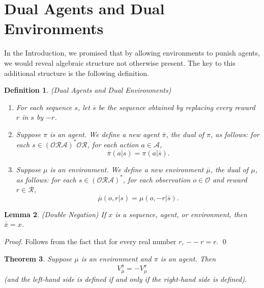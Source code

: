 \documentclass[runningheads]{llncs}
\newtheorem{mytheorem}{Theorem}
\newtheorem{mydefinition}[mytheorem]{Definition}
\newtheorem{mylemma}[mytheorem]{Lemma}
\begin{document}
\section{Dual Agents and Dual Environments}
\label{dualsection}

In the Introduction, we promised that by allowing environments to punish agents,
we would reveal algebraic structure not otherwise present. The key to this additional
structure is the following definition.

\begin{mydefinition}
(Dual Agents and Dual Environments)
\begin{enumerate}
    \item
    For each sequence $s$, let $\overline s$ be the sequence obtained
    by replacing every reward $r$ in $s$ by $-r$.
    \item
    Suppose $\pi$ is an agent.
    We define a new agent $\overline \pi$, the \emph{dual} of $\pi$,
    as follows:
    for each $s\in (\mathcal O\mathcal R\mathcal A)^*\mathcal O\mathcal R$,
    for each action $a\in\mathcal A$,
    \[\overline\pi(a|s)=\pi(a|\overline s).\]
    \item
    Suppose $\mu$ is an environment.
    We define a new environment $\overline\mu$, the \emph{dual} of $\mu$,
    as follows:
    for each $s\in (\mathcal O\mathcal R\mathcal A)^*$,
    for each observation $o\in\mathcal O$
    and reward $r\in\mathcal R$,
    \[\overline\mu(o,r|s)=\mu(o,-r|\overline s).\]
\end{enumerate}
\end{mydefinition}

\begin{mylemma}
\label{doublesubtractionlemma}
(Double Negation)
If $x$ is a sequence, agent, or environment, then $\overline{\overline x}=x$.
\end{mylemma}

\begin{proof}
    Follows from the fact that for every real number $r$, $--r=r$.
    \qed
\end{proof}

\begin{mytheorem}
\label{bigtheorem}
    Suppose $\mu$ is an environment and $\pi$ is an agent.
    Then
    \[
        V^{\overline \pi}_{\overline \mu}=-V^\pi_\mu
    \]
    (and the left-hand side is defined if and only if the right-hand side is defined).
\end{mytheorem}
\end{document}
